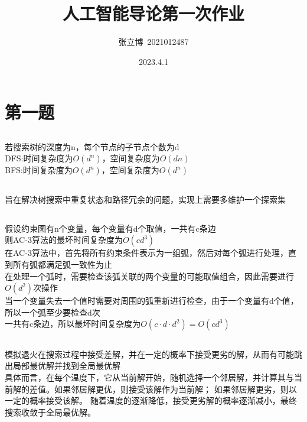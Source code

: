 \documentclass[12pt,a4paper]{article}
\title{\textbf{人工智能导论第一次作业}}
\author{张立博\ 2021012487}
\date{2023.4.1}
\begin{document}
\maketitle

\section{第一题}
\subsection{}
若搜索树的深度为n，每个节点的子节点个数为d\\
DFS:时间复杂度为$O(d^n)$，空间复杂度为$O(dn)$\\
BFS:时间复杂度为$O(d^n)$，空间复杂度为$O(d^n)$\\
\subsection{}
旨在解决树搜索中重复状态和路径冗余的问题，实现上需要多维护一个探索集
\subsection{}
假设约束图有n个变量，每个变量有d个取值，一共有c条边\\
则AC-3算法的最坏时间复杂度为$O(cd^3)$\\
在AC-3算法中，首先将所有约束条件表示为一组弧，然后对每个弧进行处理，直到所有弧都满足弧一致性为止\\
在处理一个弧时，需要检查该弧关联的两个变量的可能取值组合，因此需要进行$O(d^2)$次操作\\
当一个变量失去一个值时需要对周围的弧重新进行检查，由于一个变量有d个值，所以一个弧至少要检查d次\\
一共有c条边，所以最坏时间复杂度为$O(c·d·d^2) = O(cd^3)$
\subsection{}
模拟退火在搜索过程中接受差解，并在一定的概率下接受更劣的解，从而有可能跳出局部最优解并找到全局最优解\\
具体而言，在每个温度下，它从当前解开始，随机选择一个邻居解，并计算其与当前解的差值。如果邻居解更优，则接受该解作为当前解；
如果邻居解更劣，则以一定的概率接受该解。
随着温度的逐渐降低，接受更劣解的概率逐渐减小，最终搜索收敛于全局最优解。
\end{document}
